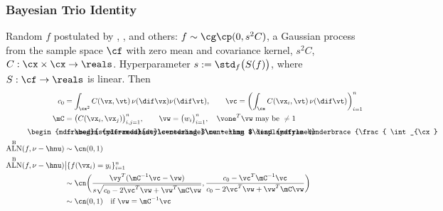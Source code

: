 \documentclass[10pt,compress,xcolor={usenames,dvipsnames}]{beamer} %
\DeclareMathOperator{\algn}{ALN}
\DeclareMathOperator{\disc}{DSC}
\DeclareMathOperator{\Var}{VAR}
\DeclareMathOperator{\GP}{\cg\cp}
\newcommand{\Ba}{\text{B}}
\newcommand{\redroundmathbox}[1]{\parbox{\widthof{$#1$\hspace{1em}}}
	{\begin{mdframed}[style=redshade]\centering $#1$ \end{mdframed}}}
\begin{document}
\begin{frame}
	\frametitle{Bayesian Trio Identity}
	\vspace*{-4ex}
	\alert{Random} $f$ postulated by \cite{Dia88a}, \cite{OHa91a}, \cite{Rit00a}  and others:  $f \sim \GP (0, s^2C)$,  a \alert{Gaussian process} from the sample space $\cf$ with zero mean and covariance kernel, $s^2C$, $C:\cx \times \cx \to \reals$. \alert{Hyperparameter} 	$s := \std_{f}\bigl(S(f)\bigr)$, where $S : \cf \to \reals$ is linear.  Then 
	\vspace{-1ex}
	\begin{align*}
	c_0 & = \int_{\cx^2} C(\vx,\vt) \, \nu(\dif \vx) \nu(\dif \vt), \qquad \vc = \biggl( \int_{\cx} C(\vx_i,\vt) \,\nu(\dif \vt) \biggr)_{i=1}^n \\
	\mC & = \bigl( C(\vx_i,\vx_j) \bigr)_{i,j=1}^n, \qquad \vw = \bigl(w_i \bigr)_{i=1}^n,  \quad \vone^T \vw \text{ may be } \ne 1\\
	\redroundmathbox{\mu - \hmu} 
	& = \redroundmathbox{\displaystyle%
		\underbrace{\frac{ \int_{\cx} f(\vx) \, (\nu - \hnu)(\dif\vx)}{s \sqrt{c_0 - 2 \vc^T \vw + \vw^T \mC \vw}}}_{\textstyle \algn^\Ba(f,\nu - \hnu)} \, 
		\underbrace{\sqrt{c_0 - 2 \vc^T \vw + \vw^T \mC \vw}}_{\textstyle\disc^\Ba(\nu - \hnu)} \, \underbrace{s}_{\textstyle\Var^\Ba(f)}}\\
	\algn^\Ba(f,\nu - \hnu) &\sim \cn ( 0, 1 ) \\
	\algn^\Ba(f,\nu - \hnu) & \big \vert \{f(\vx_i )= y_i\}_{i=1}^n \\
	& \sim \cn \biggl( \frac{\vy^T (\mC^{-1}\vc - \vw)}{s\sqrt{c_0 - 2 \vc^T \vw + \vw^T \mC \vw}}, \frac{c_0 - \vc ^T \mC^{-1} \vc}{c_0 - 2 \vc^T \vw + \vw^T \mC \vw} \biggr) \\
	& \sim \cn (0,1) \quad \text{if } \vw = \mC^{-1}\vc 
	\end{align*}	
\end{frame}
\end{document}

